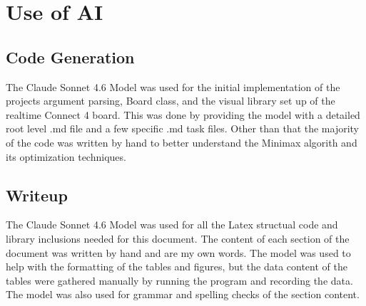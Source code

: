 \documentclass[conference]{IEEEtran}
\begin{document}
\section*{Use of AI}
\subsection*{Code Generation}
The Claude Sonnet 4.6 Model was used for the initial implementation of the projects argument parsing, Board class, and the visual library set up of the realtime Connect 4 board. This was done by providing the model with a detailed root level .md file and a few specific .md task files. Other than that the majority of the code was written by hand to better understand the Minimax algorith and its optimization techniques.
\subsection*{Writeup}
The Claude Sonnet 4.6 Model was used for all the Latex structual code and library inclusions needed for this document. The content of each section of the document was written by hand and are my own words. The model was used to help with the formatting of the tables and figures, but the data content of the tables were gathered manually by running the program and recording the data. The model was also used for grammar and spelling checks of the section content.
\end{document}
